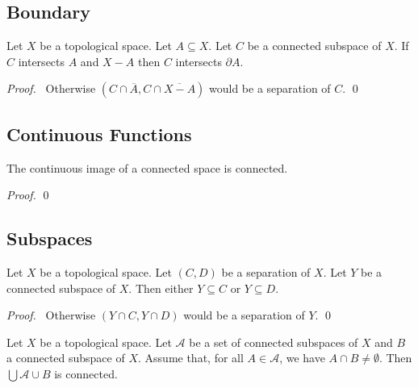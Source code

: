 \subsection{Boundary}

\begin{prop}
Let $X$ be a topological space. Let $A \subseteq X$. Let $C$ be a connected subspace of $X$. If $C$ intersects $A$ and $X - A$ then $C$ intersects $\partial A$.
\end{prop}

\begin{proof}
\pf\ Otherwise $(C \cap \overline{A}, C \cap \overline{X - A})$ would be a separation of $C$. \qed
\end{proof}

\subsection{Continuous Functions}

\begin{prop}
The continuous image of a connected space is connected.
\end{prop}

\begin{proof}
\pf
{}
\qed
\end{proof}

\subsection{Subspaces}

\begin{prop}
\label{prop:connected_subspace}
Let $X$ be a topological space. Let $(C,D)$ be a separation of $X$. Let $Y$ be a connected subspace of $X$. Then either $Y \subseteq C$ or $Y \subseteq D$.
\end{prop}

\begin{proof}
\pf\ Otherwise $(Y \cap C, Y \cap D)$ would be a separation of $Y$. \qed
\end{proof}

\begin{prop}
\label{prop:connected_union}
Let $X$ be a topological space. Let $\mathcal{A}$ be a set of connected subspaces of $X$ and $B$ a connected subspace of $X$. Assume that, for all $A \in \mathcal{A}$, we have $A \cap B \neq \emptyset$. Then $\bigcup \mathcal{A} \cup B$ is connected.
\end{prop}

